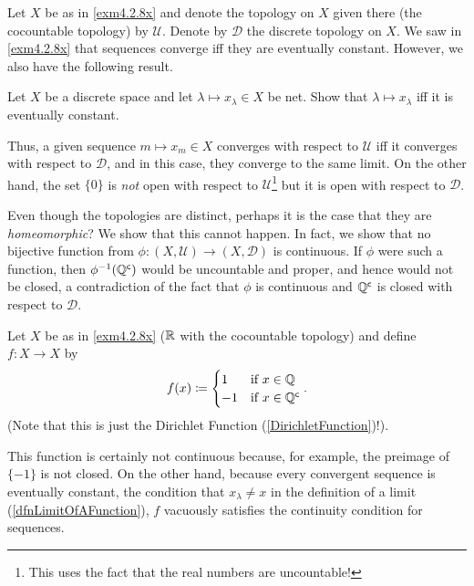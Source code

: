 \begin{exm}\label{exm4.2.25}
Let $X$ be as in \cref{exm4.2.8x} and denote the topology on $X$ given there (the cocountable topology) by $\mathcal{U}$.  Denote by $\mathcal{D}$ the discrete topology on $X$.  We saw in \cref{exm4.2.8x} that sequences converge iff they are eventually constant.  However, we also have the following result.
\begin{exr}
Let $X$ be a discrete space and let $\lambda \mapsto x_\lambda \in X$ be net.  Show that $\lambda \mapsto x_\lambda$ iff it is eventually constant.
\end{exr}
Thus, a given sequence $m\mapsto x_m\in X$ converges with respect to $\mathcal{U}$ iff it converges with respect to $\mathcal{D}$, and in this case, they converge to the same limit.  On the other hand, the set $\{ 0\}$ is \emph{not} open with respect to $\mathcal{U}$\footnote{This uses the fact that the real numbers are uncountable!} but it is open with respect to $\mathcal{D}$.

Even though the topologies are distinct, perhaps it is the case that they are \emph{homeomorphic}?  We show that this cannot happen.  In fact, we show that no bijective function from $\phi :(X,\mathcal{U})\rightarrow (X,\mathcal{D})$ is continuous.  If $\phi$ were such a function, then $\phi ^{-1}(\mathbb{Q} ^{\mathsf{c}})$ would be uncountable and proper, and hence would not be closed, a contradiction of the fact that $\phi$ is continuous and $\mathbb{Q} ^{\mathsf{c}}$ is closed with respect to $\mathcal{D}$.
\end{exm}
\begin{exm}\label{exm4.2.8}
Let $X$ be as in \cref{exm4.2.8x} ($\mathbb{R}$ with the cocountable topology) and define $f:X\rightarrow X$ by
\begin{equation}
f(x)\coloneqq \begin{cases}1 & \text{if }x\in \mathbb{Q} \\ -1 & \text{if }x\in \mathbb{Q} ^{\mathsf{c}}\end{cases}.
\end{equation}
(Note that this is just the Dirichlet Function (\cref{DirichletFunction})!).

This function is certainly not continuous because, for example, the preimage of $\{ -1\}$ is not closed.  On the other hand, because every convergent sequence is eventually constant, the condition that $x_\lambda \neq x$ in the definition of a limit (\cref{dfnLimitOfAFunction}), $f$ vacuously satisfies the continuity condition for sequences.
\end{exm}
